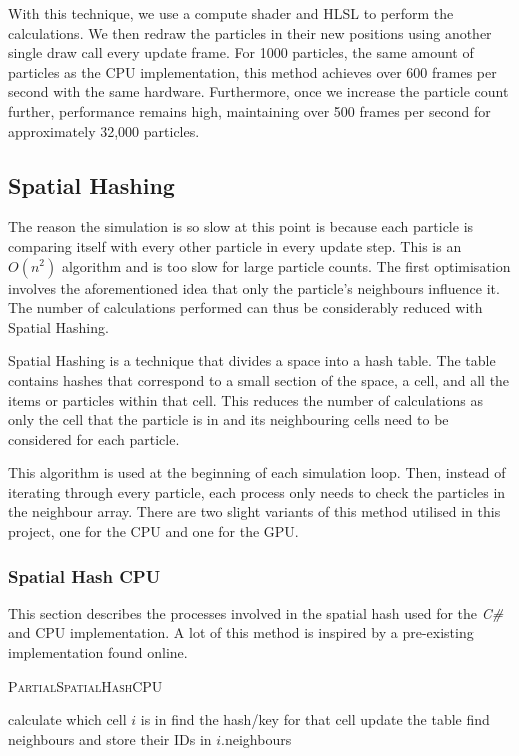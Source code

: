 \documentclass[12pt]{article}
\begin{document}
    With this technique, we use a compute shader and HLSL to perform the calculations. We then redraw the particles in their new positions using another single draw call every update frame. For 1000 particles, the same amount of particles as the CPU implementation, this method achieves over 600 frames per second with the same hardware. Furthermore, once we increase the particle count further, performance remains high, maintaining over 500 frames per second for approximately 32,000 particles.

    \subsection{Spatial Hashing}

    The reason the simulation is so slow at this point is because each particle is comparing itself with every other particle in every update step. This is an $O(n^2)$ algorithm and is too slow for large particle counts. The first optimisation involves the aforementioned idea that only the particle's neighbours influence it. The number of calculations performed can thus be considerably reduced with Spatial Hashing.

    Spatial Hashing is a technique that divides a space into a hash table. The table contains hashes that correspond to a small section of the space, a cell, and all the items or particles within that cell\cite{spatialpython}. This reduces the number of calculations as only the cell that the particle is in and its neighbouring cells need to be considered for each particle. 
    
    This algorithm is used at the beginning of each simulation loop. Then, instead of iterating through every particle, each process only needs to check the particles in the neighbour array. There are two slight variants of this method utilised in this project, one for the CPU and one for the GPU.

    \subsubsection{Spatial Hash CPU}

    This section describes the processes involved in the spatial hash used for the \textit{C\#} and CPU implementation. A lot of this method is inspired by a pre-existing implementation found online\cite{sphspatialexample}.

    \begin{algorithm}[H]
        \caption{\textsc{PartialSpatialHashCPU}}
    
        \begin{algorithmic}[1]
                \State calculate which cell $i$ is in
                \State find the hash/key for that cell
            \EndFor
                \State update the table
            \EndFor
                \State find neighbours and store their IDs in $i$.neighbours
            \EndFor
        \end{algorithmic}
    \end{algorithm}
\end{document}
